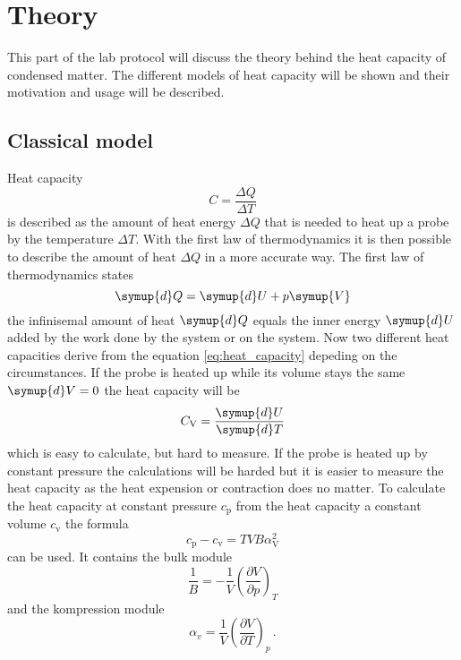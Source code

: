 \section{Theory}
\label{sec:theorie}
This part of the lab protocol will discuss the theory behind the heat capacity of condensed matter.
The different models of heat capacity will be shown and their motivation and usage will be described.
\subsection{Classical model}
Heat capacity 
\begin{equation}
    C = \frac{\Delta Q}{\Delta T}
    \label{eq:heat_capacity}
\end{equation}
is described as the amount of heat energy $\Delta Q$ that is needed to heat up a probe by the temperature $\Delta T$.
With the first law of thermodynamics it is then possible to describe the amount of heat $\Delta Q$ in a more accurate way.
The first law of thermodynamics states 
\begin{equation*}
    \symup{d}Q = \symup{d}U + p\symup{V}
\end{equation*}
the infinisemal amount of heat $\symup{d}Q$ equals the inner energy $\symup{d}U$ added by the work done by the system or on the system.
Now two different heat capacities derive from the equation \eqref{eq:heat_capacity} depeding on the circumstances.
If the probe is heated up while its volume stays the same $\symup{d}V=0$ the heat capacity will be 
\begin{equation}
    C_\text{V} = \frac{\symup{d}U}{\symup{d}T}
    \label{eq:heat_cap_v}
\end{equation}
which is easy to calculate, but hard to measure.
If the probe is heated up by constant pressure the calculations will be harded but it is easier to measure the heat capacity as the heat expension or contraction does no matter.
To calculate the heat capacity at constant pressure $c_\text{p}$ from the heat capacity a constant volume $c_\text{v}$ the formula
\begin{equation}
    c_\text{p} - c_\text{v} = TVB\alpha_\text{V}^2
    \label{eq:correction_formula}
\end{equation}
can be used.
It contains the bulk module 
\begin{equation*}
\frac{1}{B} = - \frac{1}{V} \left (\frac{\partial  V}{\partial p} \right )_T
\end{equation*}
and the kompression module
\begin{equation*}
    \alpha_v = \frac{1}{V} \left( \frac{\partial V}{\partial T}\right )_p\, .
\end{equation*}
